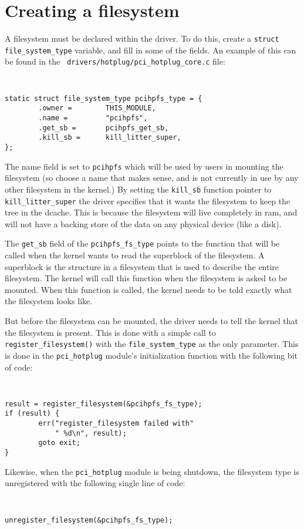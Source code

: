 \documentclass[twocolumn]{article}
\begin{document}
\section{Creating a filesystem}
A filesystem must be declared within the driver.
To do this,
create a {\tt struct file\_system\_type} variable, and fill in some of the
fields.  An example of this can be found in the {\tt
drivers/hotplug/pci\_hotplug\_core.c} file:
{\tt \small
\begin{verbatim}
static struct file_system_type pcihpfs_type = {
        .owner =        THIS_MODULE,
        .name =         "pcihpfs",
        .get_sb =       pcihpfs_get_sb,
        .kill_sb =      kill_litter_super, 
};      
\end{verbatim}
}
The name field is set to {\tt pcihpfs} which will be used by users in
mounting the filesystem (so choose a name that makes sense, and is not
currently in use by any other filesystem in the kernel.)  By setting the
{\tt kill\_sb} function pointer to {\tt kill\_litter\_super} the driver specifies
that it wants the filesystem to keep the tree in the dcache.  This is
because the filesystem will live completely in ram, and will not have a
backing store of the data on any physical device (like a disk).

The {\tt get\_sb} field of the {\tt pcihpfs\_fs\_type} points to the 
function that will be called when the kernel wants to read the superblock
of the filesystem.  A superblock is the structure in a filesystem that is
used to describe the entire filesystem.  The kernel will call this function
when the filesystem is asked to be mounted.  When this function is called,
the kernel needs to be told exactly what the filesystem looks like.

But before the filesystem can be mounted, the driver needs to tell the
kernel that the filesystem is present.  This is done with a simple call to
{\tt register\_filesystem()} with the {\tt file\_system\_type} as the only parameter.
This is done in the {\tt pci\_hotplug} module's initialization function with the
following bit of code:
{\tt \small
\begin{verbatim}
result = register_filesystem(&pcihpfs_fs_type);
if (result) {
        err("register_filesystem failed with"
            " %d\n", result);
        goto exit;
}
\end{verbatim}
}

Likewise, when the {\tt pci\_hotplug} module is being shutdown, the
filesystem type is unregistered with the following single line of code:
{\tt \small
\begin{verbatim}
unregister_filesystem(&pcihpfs_fs_type);
\end{verbatim}
}
\end{document}
